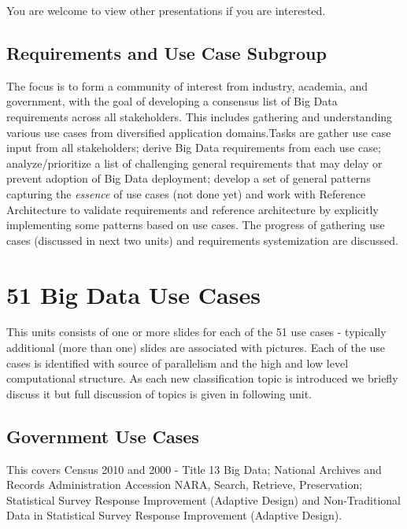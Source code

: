 You are welcome to view other presentations if you are interested.

\subsection{Requirements and Use Case Subgroup}

The focus is to form a community of interest from industry, academia,
and government, with the goal of developing a consensus list of Big Data
requirements across all stakeholders. This includes gathering and
understanding various use cases from diversified application
domains.Tasks are gather use case input from all stakeholders; derive
Big Data requirements from each use case; analyze/prioritize a list of
challenging general requirements that may delay or prevent adoption of
Big Data deployment; develop a set of general patterns capturing the
\textit{essence} of use cases (not done yet) and work with Reference
Architecture to validate requirements and reference architecture by
explicitly implementing some patterns based on use cases. The progress
of gathering use cases (discussed in next two units) and requirements
systemization are discussed.




\section{51 Big Data Use Cases}

This units consists of one or more slides for each of the 51 use cases -
typically additional (more than one) slides are associated with
pictures. Each of the use cases is identified with source of parallelism
and the high and low level computational structure. As each new
classification topic is introduced we briefly discuss it but full
discussion of topics is given in following unit.




\subsection{Government Use Cases}

This covers Census 2010 and 2000 - Title 13 Big Data; National Archives
and Records Administration Accession NARA, Search, Retrieve,
Preservation; Statistical Survey Response Improvement (Adaptive Design)
and Non-Traditional Data in Statistical Survey Response Improvement
(Adaptive Design).


